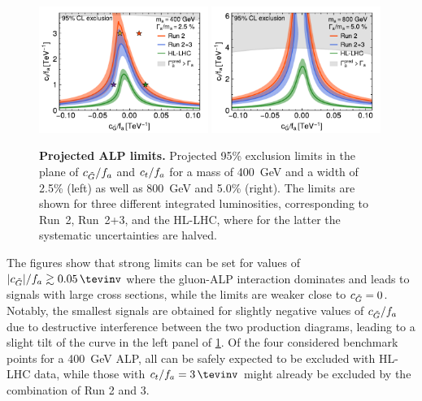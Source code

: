 \begin{figure}[t]
    \centering
    \includegraphics[width=0.49\textwidth]{figures/alps/limits_m400_w2p5_notmass_small_width.pdf}
    \hfill
    \includegraphics[width=0.49\textwidth]{figures/alps/limits_m800_w5p0_notmass_small.pdf}
    \caption{
        \textbf{Projected ALP limits.} Projected 95\% exclusion limits in the plane of $c_{\tilde{G}}/f_a$ and $c_t/f_a$ for a mass of \SI{400}{\GeV} and a width of 2.5\% (left) as well as \SI{800}{\GeV} and 5.0\% (right). The limits are shown for three different integrated luminosities, corresponding to Run~2, Run~2+3, and the HL-LHC, where for the latter the systematic uncertainties are halved.
    }
    \label{fig:alps:limits}
\end{figure}

The figures show that strong limits can be set for values of $|\cG|/f_a 	\gtrsim \SI{0.05}{\tevinv}$ where the gluon-ALP interaction dominates and leads to signals with large cross sections, while the limits are weaker close to $c_{\tilde{G}} = 0$. Notably, the smallest signals are obtained for slightly negative values of $c_{\tilde{G}}/f_a$ due to destructive interference between the two production diagrams, leading to a slight tilt of the curve in the left panel of \cref{fig:alps:limits}. Of the four considered benchmark points for a \SI{400}{\GeV} ALP, all can be safely expected to be excluded with HL-LHC data, while those with $\ct/f_a = \SI{3}{\tevinv}$ might already be excluded by the combination of Run 2 and 3.

